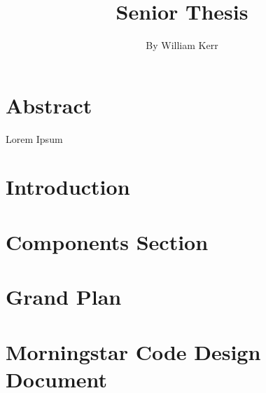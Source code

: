 \documentclass[a4paper,12pt]{report}
\begin{document}

\title{\Large{\textbf{Senior Thesis}}}
\author{By William Kerr}
\iffalse
\date{\date{\parbox{\linewidth}{\centering%
  \today\endgraf\bigskip
  Coordinator 1 \hspace*{3cm} Coordinator 2\endgraf\medskip
  Dept.\ of Physics \endgraf
  ABC College}}}
\fi
\maketitle %
\tableofcontents %

\setcounter{page}{2} %


\chapter{Abstract}
Lorem Ipsum 
\chapter{Introduction}%



\chapter{Components Section}


\chapter{Grand Plan}


\chapter{Morningstar Code Design Document }

\end{document}

